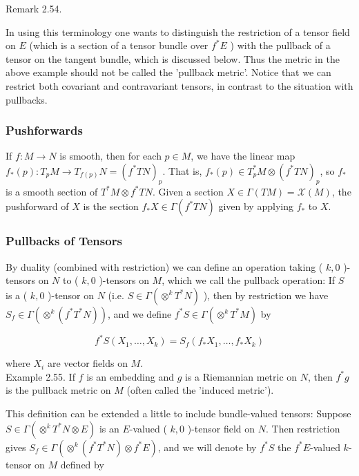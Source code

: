 \documentclass[10pt, letterpaper]{article}
\begin{document}
Remark 2.54. 

In using this terminology one wants to distinguish the restriction of a tensor field on $E$ (which is a section of a tensor bundle over $f^{*} E$ ) with the pullback of a tensor on the tangent bundle, which is discussed below. Thus the metric in the above example should not be called the 'pullback metric'. Notice that we can restrict both covariant and contravariant tensors, in contrast to the situation with pullbacks.


\subsubsection*{Pushforwards}
If $f: M \rightarrow N$ is smooth, then for each $p \in M$, we have the linear map $f_{*}(p): T_{p} M \rightarrow T_{f(p)} N=\left(f^{*} T N\right)_{p}$. That is, $f_{*}(p) \in T_{p}^{*} M \otimes\left(f^{*} T N\right)_{p}$, so $f_{*}$ is a smooth section of $T^{*} M \otimes f^{*} T N$. Given a section $X \in \Gamma(T M)=\mathscr{X}(M)$, the pushforward of $X$ is the section $f_{*} X \in \Gamma\left(f^{*} T N\right)$ given by applying $f_{*}$ to $X$.

\subsubsection*{Pullbacks of Tensors}
By duality (combined with restriction) we can define an operation taking ( $k, 0$ )-tensors on $N$ to ( $k, 0$ )-tensors on $M$, which we call the pullback operation: If $S$ is a ( $k, 0$ )-tensor on $N$ (i.e. $S \in \Gamma\left(\otimes^{k} T^{*} N\right)$ ), then by restriction we have $S_{f} \in \Gamma\left(\otimes^{k}\left(f^{*} T^{*} N\right)\right)$, and we define $f^{*} S \in \Gamma\left(\otimes^{k} T^{*} M\right)$ by

$$
f^{*} S\left(X_{1}, \ldots, X_{k}\right)=S_{f}\left(f_{*} X_{1}, \ldots, f_{*} X_{k}\right)
$$

where $X_{i}$ are vector fields on $M$.\\
Example 2.55. If $f$ is an embedding and $g$ is a Riemannian metric on $N$, then $f^{*} g$ is the pullback metric on $M$ (often called the 'induced metric').

This definition can be extended a little to include bundle-valued tensors: Suppose $S \in \Gamma\left(\otimes^{k} T^{*} N \otimes E\right)$ is an $E$-valued ( $k, 0$ )-tensor field on $N$. Then restriction gives $S_{f} \in \Gamma\left(\otimes^{k}\left(f^{*} T^{*} N\right) \otimes f^{*} E\right)$, and we will denote by $f^{*} S$ the $f^{*} E$-valued $k$-tensor on $M$ defined by
\end{document}
